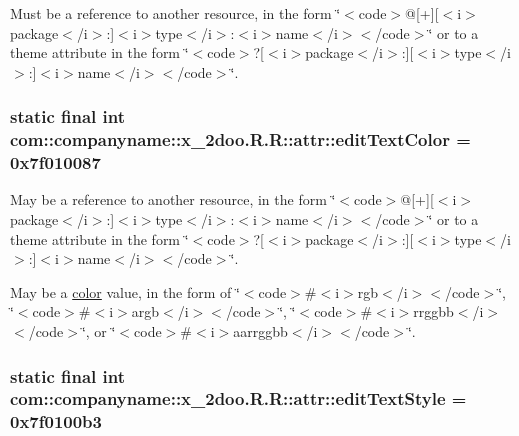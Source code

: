 Must be a reference to another resource, in the form \char`\"{}$<$code$>$@\mbox{[}+\mbox{]}\mbox{[}$<$i$>$package$<$/i$>$:\mbox{]}$<$i$>$type$<$/i$>$:$<$i$>$name$<$/i$>$$<$/code$>$\char`\"{} or to a theme attribute in the form \char`\"{}$<$code$>$?\mbox{[}$<$i$>$package$<$/i$>$:\mbox{]}\mbox{[}$<$i$>$type$<$/i$>$:\mbox{]}$<$i$>$name$<$/i$>$$<$/code$>$\char`\"{}. \hypertarget{classcom_1_1companyname_1_1x__2doo_1_1_r_1_1attr_d0c01f8a0073181dfe0f38cbcd16e1ce}{
\subsubsection[{editTextColor}]{\setlength{\rightskip}{0pt plus 5cm}static final int com::companyname::x\_\-2doo.R.R::attr::editTextColor = 0x7f010087}}
\label{classcom_1_1companyname_1_1x__2doo_1_1_r_1_1attr_d0c01f8a0073181dfe0f38cbcd16e1ce}


May be a reference to another resource, in the form \char`\"{}$<$code$>$@\mbox{[}+\mbox{]}\mbox{[}$<$i$>$package$<$/i$>$:\mbox{]}$<$i$>$type$<$/i$>$:$<$i$>$name$<$/i$>$$<$/code$>$\char`\"{} or to a theme attribute in the form \char`\"{}$<$code$>$?\mbox{[}$<$i$>$package$<$/i$>$:\mbox{]}\mbox{[}$<$i$>$type$<$/i$>$:\mbox{]}$<$i$>$name$<$/i$>$$<$/code$>$\char`\"{}. 

May be a \hyperlink{classcom_1_1companyname_1_1x__2doo_1_1_r_1_1color}{color} value, in the form of \char`\"{}$<$code$>$\#$<$i$>$rgb$<$/i$>$$<$/code$>$\char`\"{}, \char`\"{}$<$code$>$\#$<$i$>$argb$<$/i$>$$<$/code$>$\char`\"{}, \char`\"{}$<$code$>$\#$<$i$>$rrggbb$<$/i$>$$<$/code$>$\char`\"{}, or \char`\"{}$<$code$>$\#$<$i$>$aarrggbb$<$/i$>$$<$/code$>$\char`\"{}. \hypertarget{classcom_1_1companyname_1_1x__2doo_1_1_r_1_1attr_65b33de7ca942cb2f898a4f081f3314e}{
\subsubsection[{editTextStyle}]{\setlength{\rightskip}{0pt plus 5cm}static final int com::companyname::x\_\-2doo.R.R::attr::editTextStyle = 0x7f0100b3}}
\label{classcom_1_1companyname_1_1x__2doo_1_1_r_1_1attr_65b33de7ca942cb2f898a4f081f3314e}


